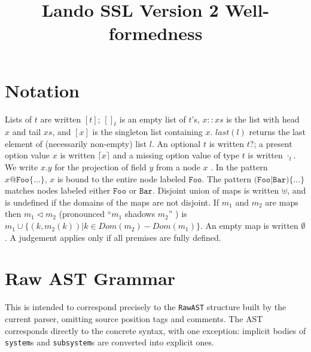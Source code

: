 \documentclass{article}
\begin{document}
\title{Lando SSL Version 2 Well-formedness}
\maketitle

\section{Notation}

\newcommand{\nt}[1]{\ensuremath{\mathit{#1}}}
\newcommand{\lab}[1]{\ensuremath{\texttt{#1}}}
\newcommand{\listof}[1]{\ensuremath{[{#1}]}}
\newcommand{\nillist}[1]{[]_{#1}}
\newcommand{\conslist}[2]{{#1}::{#2}}
\newcommand{\singlelist}[1]{[{#1}]}
\newcommand{\listlast}[1]{\mathit{last}({#1})}
\newcommand{\optof}[1]{\ensuremath{{#1}?}}
\newcommand{\some}[1]{\lceil{#1}\rceil}
\newcommand{\none}[1]{\cdot_{#1}}
\newcommand{\proj}[2]{\ensuremath{{#1}.{#2}}}
\newcommand{\emptym}{\emptyset} 
\newcommand{\shadow}{\vartriangleleft}

Lists of $t$ are written $\listof{t}$; $\nillist{t}$ is an empty list of $t$'s, $\conslist{x}{xs}$ is the list with head $x$ and tail $xs$,
and $\singlelist{x}$ is the singleton list containing $x$.
$\listlast{l}$ returns the last element of (necessarily non-empty) list $l$.
An optional $t$ is written $\optof{t}$; a present option value $x$ is written $\some{x}$ and a missing option value of type $t$ is written $\none{t}$.
We write $\proj{x}{y}$ for the projection of field $y$ from a node $x$ .
In the pattern $x@\lab{Foo}\{\ldots\}$, $x$ is bound to the entire node labeled $\lab{Foo}$.
The pattern $\lab{(Foo|Bar)}\{\ldots\}$ matches nodes labeled either $\lab{Foo}$ or $\lab{Bar}$.
Disjoint union of maps is written $\uplus$, and is undefined if the domains of the maps are not disjoint.
If $m_1$ and $m_2$ are maps then $m_1 \shadow m_2$ (pronounced ``$m_1$ shadows $m_2$'' ) is
$m_1 \cup \{(k,m_2(k)) | k \in Dom(m_2) - Dom(m_1)\}$. 
An empty map is written $\emptym$.
A judgement applies only if all premises are fully defined.
\section{Raw AST Grammar}

This is intended to correspond precisely to the {\tt RawAST} structure built by the current parser, omitting source position tags
and comments. The AST corresponds directly to the concrete syntax, with one exception: implicit bodies of {\tt system}s and {\tt subsystem}s are
converted into explicit ones. 
\end{document}
